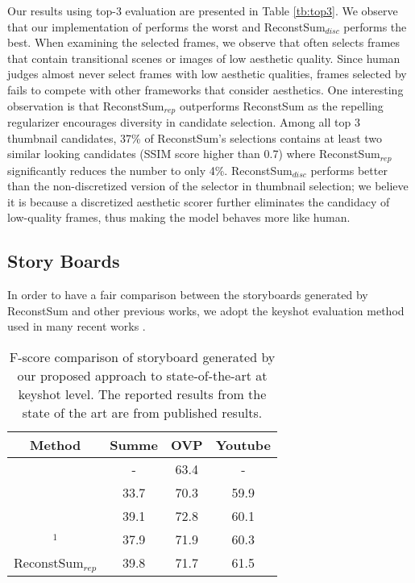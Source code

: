 \documentclass[5pt]{article}
\begin{document}
Our results using top-3 evaluation are presented in Table \ref{tb:top3}. We observe that our implementation of \cite{mahasseni2017unsupervised} performs the worst and ReconstSum$_{disc}$ performs the best. When examining the selected frames, we observe that \cite{mahasseni2017unsupervised} often selects frames that contain transitional scenes or images of low aesthetic quality. Since human judges almost never select frames with low aesthetic qualities, frames selected by \cite{mahasseni2017unsupervised} fails to compete with other frameworks that consider aesthetics. One interesting observation is that ReconstSum$_{rep}$ outperforms ReconstSum as the repelling regularizer encourages diversity in candidate selection. Among all top 3 thumbnail candidates, 37\% of ReconstSum's selections contains at least two similar looking candidates (SSIM score higher than 0.7) where ReconstSum$_{rep}$ significantly reduces the number to only 4\%. ReconstSum$_{disc}$ performs better than the non-discretized version of the selector in thumbnail selection; we believe it is because a discretized aesthetic scorer further eliminates the candidacy of low-quality frames, thus making the model behaves more like human. 

\subsection{Story Boards}
In order to have a fair comparison between the storyboards generated by ReconstSum and other previous works, we adopt the keyshot evaluation method used in many recent works \cite{zhang2016video}\cite{mahasseni2017unsupervised}. 

\begin{table}[t]
\begin{center}
\caption{F-score comparison of storyboard generated by our proposed approach to state-of-the-art at keyshot level. The reported results from the state of the art are from published results. } 
\begin{tabular}{|c|c|c|c|}
  \hline
  Method & Summe & OVP & Youtube\\
  \hline
  \cite{furini2010stimo} &  - &  63.4 & - \\
  \cite{Avila} &  33.7 &  70.3 & 59.9 \\
  \cite{mahasseni2017unsupervised} &  39.1 & 72.8  & 60.1  \\
  \cite{mahasseni2017unsupervised}$^1$ &  37.9 & 71.9  & 60.3  \\
  ReconstSum$_{rep}$ &  39.8 &  71.7 & 61.5 \\
  \hline
\end{tabular}
\label{tb:keyshot}
\end{center}
\end{table}
\end{document}
